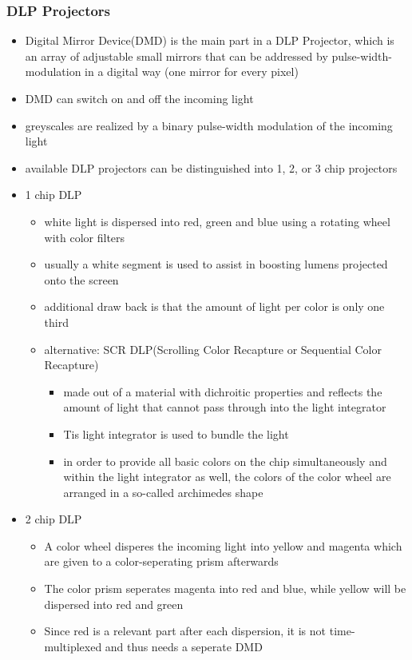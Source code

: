 \documentclass{standalone}
\begin{document}
\subsubsection*{DLP Projectors}
\begin{itemize}
\item Digital Mirror Device(DMD) is the main part in a DLP Projector, which is an array of adjustable small mirrors that can be addressed by pulse-width-modulation in a digital way (one mirror for every pixel)
\item DMD can switch on and off the incoming light
\item greyscales are realized by a binary pulse-width modulation of the incoming light
\item available DLP projectors can be distinguished into 1, 2, or 3 chip projectors
\item 1 chip DLP
\begin{itemize}
\item white light is dispersed into red, green and blue using a rotating wheel with color filters
\item usually a white segment is used to assist in boosting lumens projected onto the screen
\item additional draw back is that the amount of light per color is only one third
\item alternative: SCR DLP(Scrolling Color Recapture or Sequential Color Recapture)
\begin{itemize}
\item made out of a material with dichroitic properties and reflects the amount of light that cannot pass through into the light integrator
\item Tis light integrator is used to bundle the light
\item in order to provide all basic colors on the chip simultaneously and within the light integrator as well, the colors of the color wheel are arranged in a so-called archimedes shape
\end{itemize}
\end{itemize}
\item 2 chip DLP
\begin{itemize}
\item A color wheel disperes the incoming light into yellow and magenta which are given to a color-seperating prism afterwards
\item The color prism seperates magenta into red and blue, while yellow will be dispersed into red and green
\item Since red is a relevant part after each dispersion, it is not time-multiplexed and thus needs a seperate DMD

\end{itemize}
\end{itemize}
\end{document}
